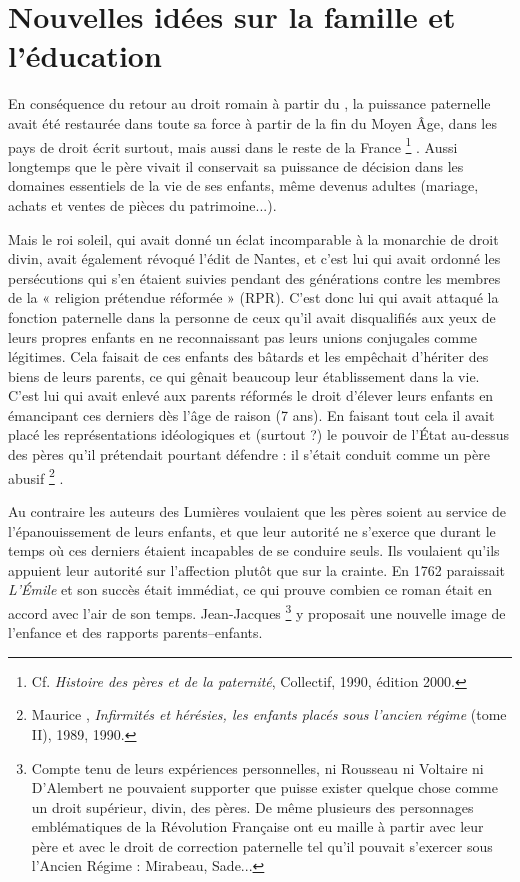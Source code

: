 \section{Nouvelles idées sur la famille et l'éducation}

 En conséquence du retour au droit romain à partir du , la puissance paternelle avait été restaurée dans toute sa force à partir de la fin du Moyen Âge, dans les pays de droit écrit surtout, mais aussi dans le reste de la France%
\footnote{Cf. \emph{Histoire des pères et de la paternité}, Collectif, 1990, édition 2000.}%
. Aussi longtemps que le père vivait il conservait sa puissance de décision dans les domaines essentiels de la vie de ses enfants, même devenus adultes (mariage, achats et ventes de pièces du patrimoine...). 

 Mais le roi soleil, qui avait donné un éclat incomparable à la monarchie de droit divin, avait également révoqué l'édit de Nantes, et c'est lui qui avait ordonné les persécutions qui s'en étaient suivies pendant des générations contre les membres de la « {religion prétendue réformée} » (RPR). C'est donc lui qui avait attaqué la fonction paternelle dans la personne de ceux qu'il avait disqualifiés aux yeux de leurs propres enfants en ne reconnaissant pas leurs unions conjugales comme légitimes. Cela faisait de ces enfants des bâtards et les empêchait d'hériter des biens de leurs parents, ce qui gênait beaucoup leur établissement dans la vie. C'est lui qui avait enlevé aux parents réformés le droit d'élever leurs enfants en émancipant ces derniers dès l'âge de raison (7 ans). En faisant tout cela il avait placé les représentations idéologiques et (surtout ?) le pouvoir de l'État au-dessus des pères qu'il prétendait pourtant défendre : il s'était conduit comme un père abusif%
\footnote{Maurice , \emph{Infirmités et hérésies, les enfants placés sous l'ancien régime} (tome II), 1989, 1990.}%
.


 Au contraire les auteurs des Lumières voulaient que les pères soient au service de l'épanouissement de leurs enfants, et que leur autorité ne s'exerce que durant le temps où ces derniers étaient incapables de se conduire seuls. Ils voulaient qu'ils appuient leur autorité sur l'affection plutôt que sur la crainte. En 1762 paraissait \emph{L'Émile} et son succès était immédiat, ce qui prouve combien ce roman était en accord avec l'air de son temps. Jean-Jacques %
\footnote{Compte tenu de leurs expériences personnelles, ni Rousseau ni Voltaire ni D'Alembert ne pouvaient supporter que puisse exister quelque chose comme un droit supérieur, divin, des pères. De même plusieurs des personnages emblématiques de la Révolution Française ont eu maille à partir avec leur père et avec le droit de correction paternelle tel qu'il pouvait s'exercer sous l'Ancien Régime : Mirabeau, Sade...} 
y proposait une nouvelle image de l'enfance et des rapports parents--enfants. 

